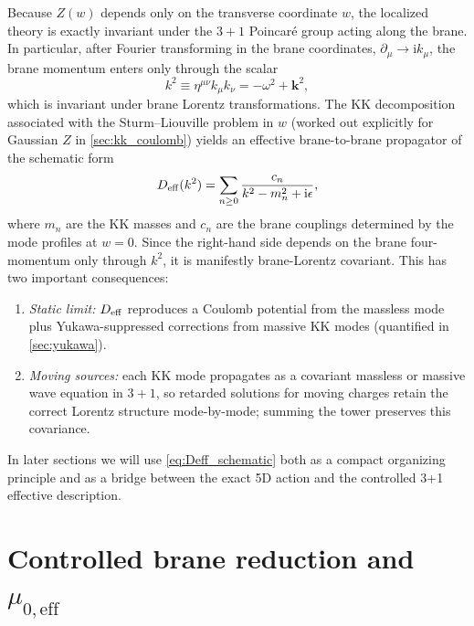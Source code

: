 \documentclass[11pt]{article}
\newcommand{\ii}{\mathrm i}
\newcommand{\Z}{Z}
\begin{document}
Because \(\Z(w)\) depends only on the transverse coordinate \(w\), the localized
theory is exactly invariant under the \(3+1\) Poincar\'e group acting along the
brane. In particular, after Fourier transforming in the brane coordinates,
\(\partial_\mu \to \ii k_\mu\), the brane momentum enters only through the scalar
\begin{equation}
  k^2 \equiv \eta^{\mu\nu}k_\mu k_\nu = -\omega^2 + \mathbf{k}^2,
\end{equation}
which is invariant under brane Lorentz transformations. The KK decomposition
associated with the Sturm--Liouville problem in \(w\) (worked out explicitly for
Gaussian \(\Z\) in \cref{sec:kk_coulomb}) yields an effective brane-to-brane
propagator of the schematic form
\begin{equation}
  D_{\rm eff}(k^2)
  = \sum_{n\ge 0}\frac{c_n}{k^2 - m_n^2 + \ii\epsilon},
  \label{eq:Deff_schematic}
\end{equation}
where \(m_n\) are the KK masses and \(c_n\) are the brane couplings determined by
the mode profiles at \(w=0\). Since the right-hand side depends on the brane
four-momentum only through \(k^2\), it is manifestly brane-Lorentz covariant.
This has two important consequences:

\begin{enumerate}
\item \emph{Static limit:} \(D_{\rm eff}\) reproduces a Coulomb potential from the
massless mode plus Yukawa-suppressed corrections from massive KK modes (quantified
in \cref{sec:yukawa}).

\item \emph{Moving sources:} each KK mode propagates as a covariant massless or
massive wave equation in \(3+1\), so retarded solutions for moving charges retain
the correct Lorentz structure mode-by-mode; summing the tower preserves this
covariance.
\end{enumerate}

In later sections we will use \cref{eq:Deff_schematic} both as a compact
organizing principle and as a bridge between the exact 5D action and the
controlled 3+1 effective description.

\section{Controlled brane reduction and \texorpdfstring{$\mu_{0,\mathrm{eff}}$}{mu0,eff}}
\label{sec:brane_reduction}
\end{document}
